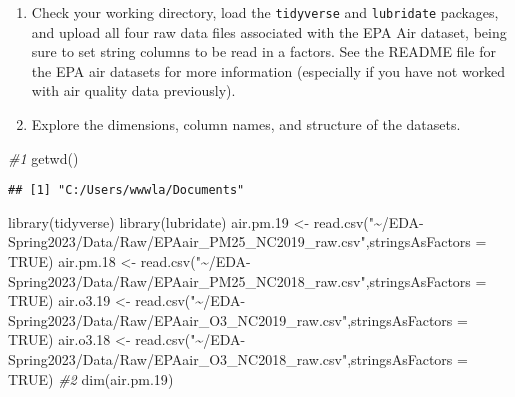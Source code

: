 \documentclass[
]{article}
\newenvironment{Shaded}{\begin{snugshade}}{\end{snugshade}}
\newcommand{\AttributeTok}[1]{\textcolor[rgb]{0.77,0.63,0.00}{#1}}
\newcommand{\CommentTok}[1]{\textcolor[rgb]{0.56,0.35,0.01}{\textit{#1}}}
\newcommand{\ConstantTok}[1]{\textcolor[rgb]{0.00,0.00,0.00}{#1}}
\newcommand{\FloatTok}[1]{\textcolor[rgb]{0.00,0.00,0.81}{#1}}
\newcommand{\FunctionTok}[1]{\textcolor[rgb]{0.00,0.00,0.00}{#1}}
\newcommand{\NormalTok}[1]{#1}
\newcommand{\OtherTok}[1]{\textcolor[rgb]{0.56,0.35,0.01}{#1}}
\newcommand{\StringTok}[1]{\textcolor[rgb]{0.31,0.60,0.02}{#1}}
\begin{document}
\begin{enumerate}
\def\labelenumi{\arabic{enumi}.}
\item
  Check your working directory, load the \texttt{tidyverse} and
  \texttt{lubridate} packages, and upload all four raw data files
  associated with the EPA Air dataset, being sure to set string columns
  to be read in a factors. See the README file for the EPA air datasets
  for more information (especially if you have not worked with air
  quality data previously).
\item
  Explore the dimensions, column names, and structure of the datasets.
\end{enumerate}

\begin{Shaded}
\begin{Highlighting}[]
\CommentTok{\#1}
\FunctionTok{getwd}\NormalTok{()}
\end{Highlighting}
\end{Shaded}

\begin{verbatim}
## [1] "C:/Users/wwwla/Documents"
\end{verbatim}

\begin{Shaded}
\begin{Highlighting}[]
\FunctionTok{library}\NormalTok{(tidyverse)}
\FunctionTok{library}\NormalTok{(lubridate)}
\NormalTok{air.pm}\FloatTok{.19} \OtherTok{\textless{}{-}} \FunctionTok{read.csv}\NormalTok{(}\StringTok{"\textasciitilde{}/EDA{-}Spring2023/Data/Raw/EPAair\_PM25\_NC2019\_raw.csv"}\NormalTok{,}\AttributeTok{stringsAsFactors =} \ConstantTok{TRUE}\NormalTok{)}
\NormalTok{air.pm}\FloatTok{.18} \OtherTok{\textless{}{-}} \FunctionTok{read.csv}\NormalTok{(}\StringTok{"\textasciitilde{}/EDA{-}Spring2023/Data/Raw/EPAair\_PM25\_NC2018\_raw.csv"}\NormalTok{,}\AttributeTok{stringsAsFactors =} \ConstantTok{TRUE}\NormalTok{)}
\NormalTok{air.o3}\FloatTok{.19} \OtherTok{\textless{}{-}} \FunctionTok{read.csv}\NormalTok{(}\StringTok{"\textasciitilde{}/EDA{-}Spring2023/Data/Raw/EPAair\_O3\_NC2019\_raw.csv"}\NormalTok{,}\AttributeTok{stringsAsFactors =} \ConstantTok{TRUE}\NormalTok{)}
\NormalTok{air.o3}\FloatTok{.18} \OtherTok{\textless{}{-}} \FunctionTok{read.csv}\NormalTok{(}\StringTok{"\textasciitilde{}/EDA{-}Spring2023/Data/Raw/EPAair\_O3\_NC2018\_raw.csv"}\NormalTok{,}\AttributeTok{stringsAsFactors =} \ConstantTok{TRUE}\NormalTok{)}
\CommentTok{\#2}
\FunctionTok{dim}\NormalTok{(air.pm}\FloatTok{.19}\NormalTok{)}
\end{Highlighting}
\end{Shaded}
\end{document}
